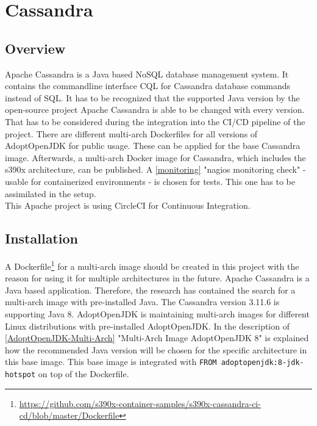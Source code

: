 \chapter{Cassandra}\label{ch:cassandra}

\section{Overview}

Apache Cassandra is a Java based NoSQL database management system. It contains the commandline interface CQL for Cassandra database commands instead of SQL. It has to be recognized that the supported Java version by the open-source project Apache Cassandra is able to be changed with every version. 
That has to be considered during the integration into the \gls{CI/CD} pipeline of the project. There are different multi-arch Dockerfiles for all versions of AdoptOpenJDK for public usage. These can be applied for the base Cassandra image. Afterwards, a multi-arch Docker image for Cassandra, which includes the s390x architecture, can be published. 
A \ref{monitoring} "nagios monitoring check" - usable for containerized environments - is chosen for tests. This one has to be assimilated in the setup. \\ 
This Apache project is using CircleCI for Continuous Integration. 

\section{Installation}\label{Cassandra-Installation}

A Dockerfile\footnote{\url{https://github.com/s390x-container-samples/s390x-cassandra-ci-cd/blob/master/Dockerfile}} for a multi-arch image should be created in this project with the reason for using it for multiple architectures in the future.
Apache Cassandra is a Java based application. Therefore, the research has contained the search for a multi-arch image with pre-installed Java. The Cassandra version 3.11.6 is supporting Java 8. 
AdoptOpenJDK is maintaining multi-arch images for different Linux distributions with pre-installed AdoptOpenJDK.
In the description of \ref{AdoptOpenJDK-Multi-Arch} "Multi-Arch Image AdoptOpenJDK 8" is explained how the recommended Java version will be chosen for the specific architecture in this base image. 
This base image is integrated with \lstinline!FROM adoptopenjdk:8-jdk-hotspot! on top of the Dockerfile.

